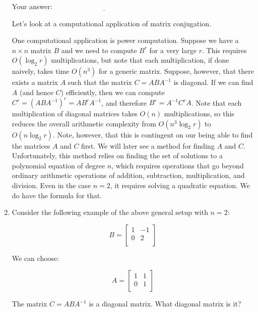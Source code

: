 \documentclass[10pt]{amsart}
\begin{document}
\begin{enumerate}
  \vspace{0.1in}
  Your answer: $\underline{\qquad\qquad\qquad\qquad\qquad\qquad\qquad}$
  \vspace{0.1in}

  Let's look at a computational application of matrix conjugation.

  One computational application is power computation. Suppose we have
  a $n \times n$ matrix $B$ and we need to compute $B^r$ for a very
  large $r$. This requires $O(\log_2r)$ multiplications, but note that
  each multiplication, if done naively, takes time $O(n^3)$ for a
  generic matrix. Suppose, however, that there exists a matrix $A$
  such that the matrix $C = ABA^{-1}$ is diagonal. If we can find $A$
  (and hence $C$) efficiently, then we can compute $C^r = (ABA^{-1})^r
  = AB^rA^{-1}$, and therefore $B^r = A^{-1}C^rA$. Note that each
  multiplication of diagonal matrices takes $O(n)$ multiplications, so
  this reduces the overall arithmetic complexity from $O(n^3\log_2r)$
  to $O(n\log_2r)$. Note, however, that this is contingent on our
  being able to find the matrices $A$ and $C$ first. We will later see
  a method for finding $A$ and $C$. Unfortunately, this method relies
  on finding the set of solutions to a polynomial equation of degree
  $n$, which requires operations that go beyond ordinary arithmetic
  operations of addition, subtraction, multiplication, and
  division. Even in the case $n = 2$, it requires solving a quadratic
  equation. We do have the formula for that.

\item Consider the following example of the above general setup with $n = 2$:

  $$B = \left[ \begin{matrix} 1 & -1 \\ 0 & 2 \\\end{matrix}\right]$$

  We can choose:

  $$A = \left[ \begin{matrix} 1 & 1 \\ 0 & 1 \\\end{matrix}\right]$$

  The matrix $C = ABA^{-1}$ is a diagonal matrix. What diagonal matrix
  is it?


\end{enumerate}
\end{document}
